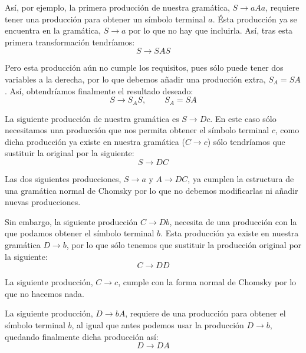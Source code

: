 \documentclass[10pt,a4paper,spanish]{report}
\begin{document}
\begin{enumerate}[a)]
Así, por ejemplo, la primera producción de nuestra gramática, $S \rightarrow aAa$, requiere tener una producción para obtener un símbolo terminal $a$. Ésta producción ya se encuentra en la gramática, $S \rightarrow a$ por lo que no hay que incluirla. Así, tras esta primera transformación tendríamos:
\begin{displaymath}
  S \rightarrow SAS
\end{displaymath}

Pero esta producción aún no cumple los requisitos, pues sólo puede tener dos variables a la derecha, por lo que debemos añadir una producción extra, $S_A = SA$. Así, obtendríamos finalmente el resultado deseado:
\begin{displaymath}
  S \rightarrow S_A S, \qquad\ S_A = SA
\end{displaymath}

La siguiente producción de nuestra gramática es $S \rightarrow Dc$. En este caso sólo necesitamos una producción que nos permita obtener el símbolo terminal $c$, como dicha producción ya existe en nuestra gramática ($C \rightarrow c$) sólo tendríamos que sustituir la original por la siguiente:
\begin{displaymath}
  S \rightarrow DC
\end{displaymath}

Las dos siguientes producciones, $S \rightarrow a$ y $A \rightarrow DC$, ya cumplen la estructura de una gramática normal de Chomsky por lo que no debemos modificarlas ni añadir nuevas producciones.

Sin embargo, la siguiente producción $C \rightarrow Db$, necesita de una producción con la que podamos obtener el símbolo terminal $b$. Esta producción ya existe en nuestra gramática $D \rightarrow b$, por lo que sólo tenemos que sustituir la producción original por la siguiente:
\begin{displaymath}
  C \rightarrow DD
\end{displaymath}

La siguiente producción, $C \rightarrow c$, cumple con la forma normal de Chomsky por lo que no hacemos nada.

La siguiente producción, $D \rightarrow bA$, requiere de una producción para obtener el símbolo terminal $b$, al igual que antes podemos usar la producción $D \rightarrow b$, quedando finalmente dicha producción así:
\begin{displaymath}
  D \rightarrow DA
\end{displaymath}


\end{enumerate}
\end{document}
